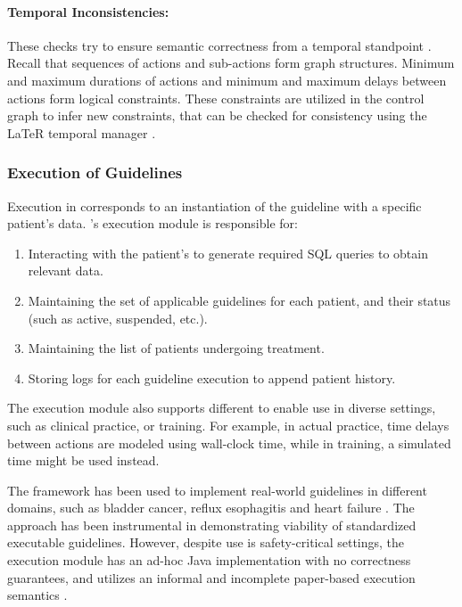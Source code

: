 \paragraph{Temporal Inconsistencies:}

These checks try to ensure semantic correctness from a temporal standpoint
\cite{TerenzianiAIM01}. Recall that sequences of actions and sub-actions form graph
structures. Minimum and maximum durations of actions and minimum and maximum delays
between actions form logical constraints. These constraints
are utilized in the control graph to infer new constraints, that can be checked
for consistency using the LaTeR temporal manager \cite{BrusoniExpert97,TerenzianiAIM01} .

\subsubsection{Execution of \GLARE{} Guidelines}\label{sec:glare-execution}

Execution in \GLARE{} corresponds to an instantiation of the guideline
with a specific patient's data. \GLARE{}'s execution module is responsible
for:
\begin{enumerate}[label=\arabic*)]
  \item Interacting with the patient's \EHR{} to generate
    required SQL \cite{SQLBook89} queries to obtain relevant data.
  \item Maintaining the set of applicable guidelines for each patient, and their
    status (such as active, suspended, etc.).
  \item Maintaining the list of patients undergoing treatment.
  \item Storing logs for each guideline execution to append patient history.
\end{enumerate}
The execution module also supports different 
to enable use in diverse settings, such as clinical practice, or training.
For example, in actual practice, time delays between actions are modeled
using wall-clock time, while in training, a simulated time might be used instead.

The \GLARE{} framework has been used to implement real-world guidelines in
different domains, such as bladder cancer, reflux esophagitis
and heart failure \cite{TerenzianiBook04}. The approach has been instrumental in
demonstrating viability of standardized executable guidelines. However, despite use is
safety-critical settings, the execution module has an ad-hoc Java
implementation with no correctness guarantees, and utilizes
an informal and incomplete paper-based execution semantics \cite{TerenzianiAIM01}.

